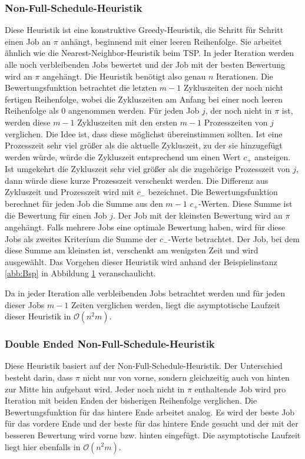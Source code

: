 \documentclass{scrreprt}
\begin{document}
\subsubsection{Non-Full-Schedule-Heuristik}
Diese Heuristik ist eine konstruktive Greedy-Heuristik, die Schritt für Schritt einen Job an $\pi$ anhängt, beginnend mit einer leeren Reihenfolge.
Sie arbeitet ähnlich wie die Nearest-Neighbor-Heuristik beim TSP.
In jeder Iteration werden alle noch verbleibenden Jobs bewertet und der Job mit der besten Bewertung wird an $\pi$ angehängt.
Die Heuristik benötigt also genau $n$ Iterationen.
Die Bewertungsfunktion betrachtet die letzten $m-1$ Zykluszeiten der noch nicht fertigen Reihenfolge, 
wobei die Zykluszeiten am Anfang bei einer noch leeren Reihenfolge als $0$ angenommen werden.
Für jeden Job $j$, der noch nicht in $\pi$ ist, werden diese $m-1$ Zykluszeiten mit den ersten $m-1$ Prozesszeiten von $j$ verglichen.
Die Idee ist, dass diese möglichst übereinstimmen sollten. Ist eine Prozesszeit sehr viel größer als die aktuelle Zykluszeit,
zu der sie hinzugefügt werden würde, würde die Zykluszeit entsprechend um einen Wert $c_+$ ansteigen.
Ist umgekehrt die Zykluszeit sehr viel größer als die zugehörige Prozesszeit von $j$, dann würde diese kurze Prozesszeit verschenkt werden.
Die Differenz aus Zykluszeit und Prozesszeit wird mit $c_-$ bezeichnet.
Die Bewertungsfunktion berechnet für jeden Job die Summe aus den $m-1$ $c_+$-Werten.
Diese Summe ist die Bewertung für einen Job $j$. Der Job mit der kleinsten Bewertung wird an $\pi$ angehängt.
Falls mehrere Jobs eine optimale Bewertung haben, wird für diese Jobs als zweites Kriterium die Summe der $c_-$-Werte betrachtet.
Der Job, bei dem diese Summe am kleinsten ist, verschenkt am wenigsten Zeit und wird ausgewählt.
Das Vorgehen dieser Heuristik wird anhand der Beispielinstanz \ref{abb:Bsp} in Abbildung \ref{abb:nfsbsp} veranschaulicht.
\begin{figure}
    \begin{center}
    \end{center}
    \caption{
        \label{abb:nfsbsp}
    }
\end{figure}

Da in jeder Iteration alle verbleibenden Jobs betrachtet werden und für jeden dieser Jobs $m-1$ Zeiten verglichen werden,
liegt die asymptotische Laufzeit dieser Heuristik in $\mathcal{O}(n^2m)$.

\subsubsection{Double Ended Non-Full-Schedule-Heuristik}
Diese Heuristik basiert auf der Non-Full-Schedule-Heuristik.
Der Unterschied besteht darin, dass $\pi$ nicht nur von vorne, sondern gleichzeitig auch von hinten zur Mitte hin aufgebaut wird.
Jeder noch nicht in $\pi$ enthaltende Job wird pro Iteration mit beiden Enden der bisherigen Reihenfolge verglichen.
Die Bewertungsfunktion für das hintere Ende arbeitet analog.
Es wird der beste Job für das vordere Ende und der beste für das hintere Ende gesucht und der mit der besseren Bewertung wird vorne bzw. hinten eingefügt.
Die asymptotische Laufzeit liegt hier ebenfalls in $\mathcal{O}(n^2m)$.
\end{document}
